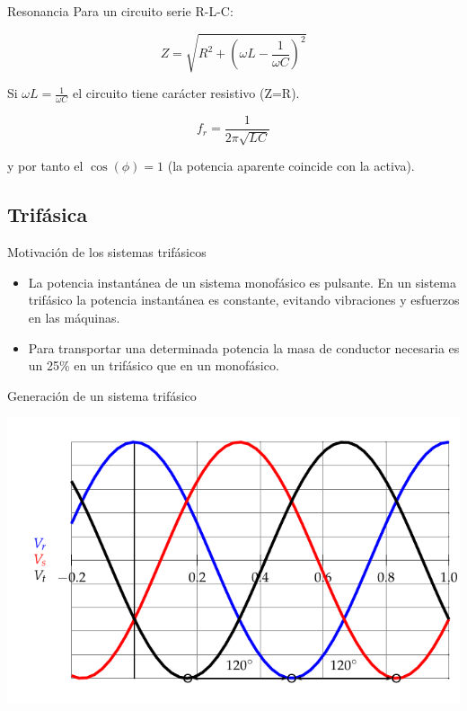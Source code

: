 \documentclass[xcolor={usenames,svgnames,dvipsnames}]{beamer}
\begin{document}
\begin{frame}[label={sec:org6b1d8cd}]{Resonancia}
Para un circuito serie R-L-C:

$$Z=\sqrt{R^{2}+\left(\omega L-\frac{1}{\omega C}\right)^{2}}$$

Si \(\omega L=\frac{1}{\omega C}\) el circuito tiene carácter resistivo
(Z=R).

$$f_{r}=\frac{1}{2\pi\sqrt{LC}}$$

y por tanto el \(\cos(\phi)=1\) (la potencia aparente coincide con la
activa).
\end{frame}

\subsection{Trifásica}
\label{sec:org901d1c1}
\begin{frame}[label={sec:org9414ce2}]{Motivación de los sistemas trifásicos}
\begin{itemize}
\item La potencia instantánea de un sistema monofásico es pulsante. En un
sistema trifásico la potencia instantánea es constante, evitando
vibraciones y esfuerzos en las máquinas.

\item Para transportar una determinada potencia la masa de conductor
necesaria es un 25\% en un trifásico que en un monofásico.
\end{itemize}
\end{frame}

\begin{frame}[label={sec:org3c1a3c6}]{Generación de un sistema trifásico}
\begin{center}
\includegraphics[width=.9\linewidth]{../figs/TensionesTrifasica.pdf}
\end{center}
\end{frame}
\end{document}

